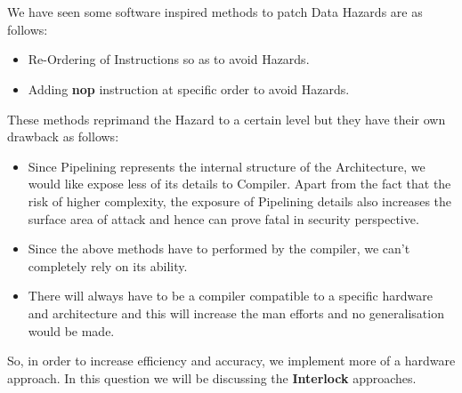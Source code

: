 \documentclass[12pt]{article}
\begin{document}
\maketitle


\section{}
We have seen some software inspired methods to patch Data Hazards are as follows:
\begin{itemize}
    \item Re-Ordering of Instructions so as to avoid Hazards.
    \item Adding \textbf{nop} instruction at specific order to avoid Hazards.
\end{itemize}
These methods reprimand the Hazard to a certain level but they have their own drawback as follows:
\begin{itemize}
    \item Since Pipelining represents the internal structure of the Architecture, we would like expose less of its details to Compiler. Apart from the fact that the risk of higher complexity, the exposure of Pipelining details also increases the surface area of attack and hence can prove fatal in security perspective.
    \item Since the above methods have to performed by the compiler, we can't completely rely on its ability.
    \item There will always have to be a compiler compatible to a specific hardware and architecture and this will increase the man efforts and no generalisation would be made.
\end{itemize}

So, in order to increase efficiency and accuracy, we implement more of a hardware approach. In this question we will be discussing the \textbf{Interlock} approaches. \\
\end{document}
